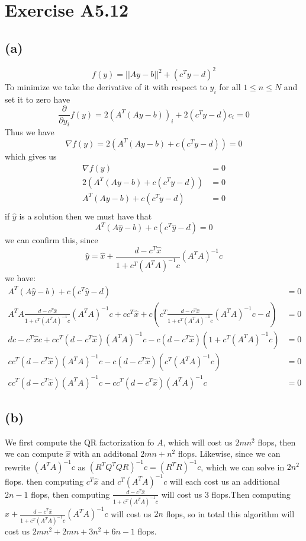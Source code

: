 \section*{Exercise A5.12}
\subsection*{(a)}
$$f(y)=||Ay-b||^2+(c^Ty-d)^2$$
To minimize we take the derivative of it with respect to $y_i$ for all
$1\leq n \leq N$ and set it to zero have
$$\frac{\partial}{\partial y_i} f(y)=2(A^T(Ay-b))_i+2(c^Ty-d)c_i=0$$
Thus we have 
$$\nabla f(y)=2(A^T(Ay-b)+c(c^Ty-d))=0$$
which gives us
\begin{align*}
    \nabla f(y)&=0\\
    2(A^T(Ay-b)+c(c^Ty-d))&=0\\
    A^T(Ay-b)+c(c^Ty-d)&=0\\
\end{align*}
if $\hat{y}$ is a solution then we must have that
$$A^T(A\hat{y}-b)+c(c^T\hat{y}-d)=0$$
we can confirm this, since 
$$\hat{y}=\hat{x}+\frac{d-c^T\hat{x}}{1+c^T(A^TA)^{-1}c}(A^TA)^{-1}c$$
we have:
\begin{align*}
    A^T(A\hat{y}-b)+c(c^T\hat{y}-d)&=0\\
    A^TA\frac{d-c^T\hat{x}}{1+c^T(A^TA)^{-1}c}(A^TA)^{-1}c+cc^T\hat{x}+c(c^T\frac{d-c^T\hat{x}}{1+c^T(A^TA)^{-1}c}(A^TA)^{-1}c-d)&=0\\
    dc-c^T\hat{x}c+cc^T(d-c^T\hat{x})(A^TA)^{-1}c-c(d-c^T\hat{x})(1+c^T(A^TA)^{-1}c)&=0\\
    cc^T(d-c^T\hat{x})(A^TA)^{-1}c-c(d-c^T\hat{x})(c^T(A^TA)^{-1}c)&=0\\
    cc^T(d-c^T\hat{x})(A^TA)^{-1}c-cc^T(d-c^T\hat{x})(A^TA)^{-1}c&=0
\end{align*}
\subsection*{(b)}
We first compute the QR factorization fo $A$, which will cost us $2mn^2$ flops, 
then we can compute 
$\hat{x}$ with an additonal $2mn+n^2$ flops. Likewise,
since we can rewrite $(A^TA)^{-1}c$ as $(R^TQ^TQR)^{-1}c=(R^TR)^{-1}c$, which 
we can solve in $2n^2$ flops. then computing $c^T\hat{x}$ and $c^T(A^TA)^{-1}c$ will
each cost us an additional $2n-1$ flops, then computing $\frac{d-c^T\hat{x}}{1+c^T(A^TA)^{-1}c}$ will 
cost us 3 flops.Then computing $\hat{x}+\frac{d-c^T\hat{x}}{1+c^T(A^TA)^{-1}c}(A^TA)^{-1}c$
will cost us $2n$ flops, so in total this algorithm will cost us 
$\boxed{2mn^2+2mn+3n^2+6n-1}$ flops.






